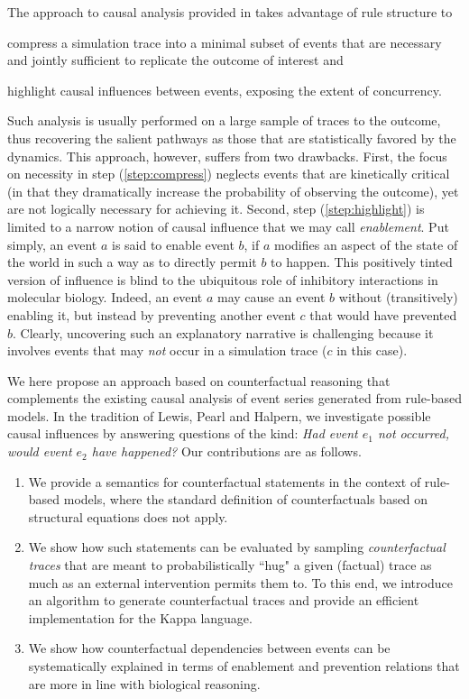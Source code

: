 The approach to causal analysis provided in
\cite{DBLP:conf/fsttcs/DanosFFHH12,DanosEtAl-CONCUR07} takes advantage
of rule structure to
\begin{inparaenum}[(i)]
\item \label{step:compress} compress a simulation trace into a minimal
  subset of events that are necessary and jointly sufficient to
  replicate the outcome of interest and
\item \label{step:highlight} highlight causal influences between
  events, exposing the extent of concurrency.
\end{inparaenum}
Such analysis is usually performed on a large sample of traces to the
outcome, thus recovering the salient pathways as those that are
statistically favored by the dynamics. This approach, however, suffers
from two drawbacks. First, the focus on necessity in step
(\ref{step:compress}) neglects events that are kinetically critical
(in that they dramatically increase the probability of observing the
outcome), yet are not logically necessary for achieving it. Second,
step (\ref{step:highlight}) is limited to a narrow notion of causal
influence that we may call \emph{enablement}. Put simply, an event $a$
is said to enable event $b$, if $a$ modifies an aspect of the state of
the world in such a way as to directly permit $b$ to happen. This
positively tinted version of influence is blind to the ubiquitous role
of inhibitory interactions in molecular biology.  Indeed, an event $a$
may cause an event $b$ without (transitively) enabling it, but instead
by preventing another event $c$ that would have prevented
$b$. Clearly, uncovering such an explanatory narrative is challenging
because it involves events that may \emph{not} occur in a simulation
trace ($c$ in this case).

We here propose an approach based on counterfactual reasoning that
complements the existing causal analysis of event series generated
from rule-based models. In the tradition of Lewis, Pearl and Halpern,
we investigate possible causal influences by answering questions of
the kind: \textit{Had event $e_1$ not occurred, would event $e_2$ have
  happened?}
Our contributions are as follows.
\begin{enumerate}
\item We provide a semantics for counterfactual statements in the
  context of rule-based models, where the standard definition of
  counterfactuals based on structural equations
  \cite{pearl2009causality} does not apply.
\item We show how such statements can be evaluated by sampling
  \emph{counterfactual traces} that are meant to probabilistically
  ``hug" a given (factual) trace as much as an external intervention
  permits them to. To this end, we introduce an algorithm to generate
  counterfactual traces and provide an efficient implementation for
  the Kappa language.
\item We show how counterfactual dependencies between events can be
  systematically explained in terms of enablement and prevention
  relations that are more in line with biological reasoning.
\end{enumerate}
